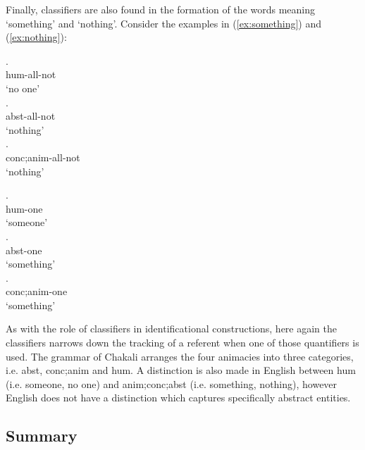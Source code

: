 \begin{exe}
\begin{exe}
\begin{exe}
{\begin{exe}
\begin{exe}
\begin{exe}
\begin{exe}
\begin{exe}
\begin{exe}
\begin{exe}
\begin{exe}
\begin{exe}
\begin{exe}
\begin{exe}
\begin{exe}
\begin{exe}
\begin{exe}
\begin{exe}
\begin{exe}
\begin{exe}
\begin{exe}
\begin{exe}
Finally,  classifiers are also found in the formation of the words
meaning  `something' and `nothing'. Consider the examples in 
(\ref{ex:something}) and (\ref{ex:nothing}):


\begin{multicols}{2}
\ea


\ea\label{ex:somethingH}
.\\
 {\sc hum}-all-not\\
\glt `no one'\\
\ex\label{ex:somethingC}
.\\
 {\sc abst}-all-not\\
\glt `nothing'\\
\ex\label{ex:somethingA}
.\\
 {\sc  conc;anim}-all-not\\
\glt `nothing'\\

\z
\z

% 
\ea
 

\ea\label{ex:somethingH}
.\\
 {\sc hum}-one\\
\glt `someone'\\
\ex\label{ex:somethingC}
.\\
 {\sc abst}-one\\
\glt `something'\\
\ex\label{ex:somethingA}
.\\
 {\sc conc;anim}-one\\
\glt `something'\\

\z
\z

\end{multicols}

As with the role of classifiers in identificational constructions, here again
the classifiers narrows down the tracking of a  referent when one of those
quantifiers is used. The grammar of Chakali arranges the four animacies into
three categories, i.e.  {\sc abst}, {\sc conc;anim} and {\sc hum}.  A
distinction is also made in English between {\sc hum} (i.e. someone, no one) and
 {\sc anim;conc;abst} (i.e. something, nothing), however English does not have
a distinction which captures  specifically abstract entities.

\subsection{Summary}
\label{sec:GRM-NP-sum}


\end{exe}
\end{exe}
\end{exe}
\end{exe}
\end{exe}
\end{exe}
\end{exe}
\end{exe}
\end{exe}
\end{exe}
\end{exe}
\end{exe}
\end{exe}
\end{exe}
\end{exe}
\end{exe}
\end{exe}
\end{exe}
\end{exe}}
\end{exe}
\end{exe}
\end{exe}
